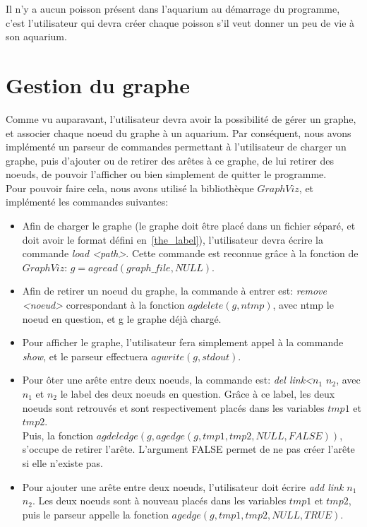 Il n'y a aucun poisson présent dans l'aquarium au démarrage du programme, c'est l'utilisateur qui devra créer chaque poisson s'il veut donner un peu de vie à son aquarium.


\section{Gestion du graphe}

\indent Comme vu auparavant, l'utilisateur devra avoir la possibilité de gérer un graphe, et associer chaque noeud du graphe à un aquarium. Par conséquent, nous avons implémenté un parseur de commandes permettant à l'utilisateur de charger un graphe, puis d'ajouter ou de retirer des arêtes à ce graphe, de lui retirer des noeuds, de pouvoir l'afficher ou bien simplement de quitter le programme.\\ Pour pouvoir faire cela, nous avons utilisé la bibliothèque $GraphViz$, et implémenté les commandes suivantes:\\
\begin{itemize}
\item Afin de charger le graphe (le graphe doit être placé dans un fichier séparé, et doit avoir le format défini en~\ref{the_label}), l'utilisateur devra écrire la commande \textit{load <path>}. Cette commande est reconnue grâce à la fonction de $GraphViz$: $g = agread(graph\_file, NULL)$.
\item Afin de retirer un noeud du graphe, la commande à entrer est: \textit{remove <noeud>} correspondant à la fonction $agdelete(g, ntmp)$, avec ntmp le noeud en question, et g le graphe déjà chargé.
\item Pour afficher le graphe, l'utilisateur fera simplement appel à la commande \textit{show}, et le parseur effectuera $agwrite(g, stdout)$.
\item Pour ôter une arête entre deux noeuds, la commande est: \textit{del link<$n_1$ $n_2$}, avec $n_1$ et $n_2$ le label des deux noeuds en question. Grâce à ce label, les deux noeuds sont retrouvés et sont respectivement placés dans les variables $tmp1$ et $tmp2$. \\Puis, la fonction $agdeledge(g, agedge(g, tmp1, tmp2, NULL, FALSE))$,  s'occupe de retirer l'arête. L'argument FALSE permet de ne pas créer l'arête si elle n'existe pas.
\item Pour ajouter une arête entre deux noeuds, l'utilisateur doit écrire \textit{add link $n_1$ $n_2$}. Les deux noeuds sont à nouveau placés dans les variables $tmp1$ et $tmp2$, puis le parseur appelle la fonction $agedge(g, tmp1, tmp2, NULL, TRUE)$.
\end{itemize}
